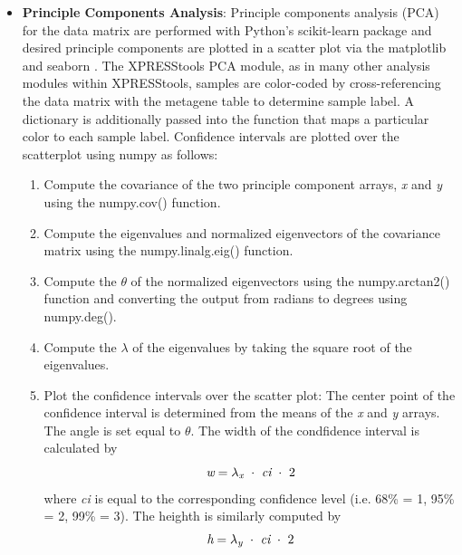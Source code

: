 \documentclass[11pt, a4paper, oneside]{article}
\begin{document}
\begin{itemize}
  \item \textbf{Principle Components Analysis}: Principle components analysis (PCA) for the data matrix are performed with Python's scikit-learn package \cite{scikit_learn} and desired principle components are plotted in a scatter plot via the matplotlib \cite{matplotlib} and seaborn \cite{seaborn}. The XPRESStools PCA module, as in many other analysis modules within XPRESStools, samples are color-coded by cross-referencing the data matrix with the metagene table to determine sample label. A dictionary is additionally passed into the function that maps a particular color to each sample label. Confidence intervals are plotted over the scatterplot using numpy \cite{numpy1, numpy2} as follows:

  \begin{enumerate}
    \item Compute the covariance of the two principle component arrays, \textit{x} and \textit{y} using the numpy.cov() function.

    \item Compute the eigenvalues and normalized eigenvectors of the covariance matrix using the numpy.linalg.eig() function.

    \item Compute the $\theta$ of the normalized eigenvectors using the numpy.arctan2() function and converting the output from radians to degrees using numpy.deg().

    \item Compute the $\lambda$ of the eigenvalues by taking the square root of the eigenvalues.

    \item Plot the confidence intervals over the scatter plot: The center point of the confidence interval is determined from the means of the \textit{x} and \textit{y} arrays. The angle is set equal to $\theta$. The width of the condfidence interval is calculated by
    \[
    \textit{w} = \lambda _{\textit{\scriptsize{x}}}\ \cdot\ \textit{ci}\ \cdot\ 2
    \]
    where \textit{ci} is equal to the corresponding confidence level (i.e. 68\% = 1, 95\% = 2, 99\% = 3). The heighth is similarly computed by
    \[
    \textit{h} = \lambda _{\textit{\scriptsize{y}}}\ \cdot\ \textit{ci}\ \cdot\ 2
    \]
  \end{enumerate}


\end{itemize}
\end{document}
